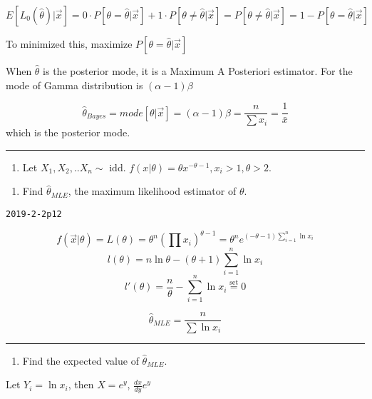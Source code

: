 \documentclass[12pt,]{article}
\providecommand{\tightlist}{%
  \setlength{\itemsep}{0pt}\setlength{\parskip}{0pt}}
\begin{document}
\[E[L_0(\hat\theta)|\vec x]=0\cdot P[\theta=\hat\theta|\vec x]+1\cdot P[\theta\neq\hat\theta|\vec x]=P[\theta\neq\hat\theta|\vec x]=1-P[\theta=\hat\theta|\vec x]\]

To minimized this, maximize \(P[\theta=\hat\theta|\vec x]\)

When \(\hat\theta\) is the posterior mode, it is a Maximum A Posteriori
estimator. For the mode of Gamma distribution is \((\alpha-1)\beta\)

\[\hat\theta_{Bayes}=mode[\theta|\vec x]=(\alpha-1)\beta=\frac{n}{\sum x_i}=\frac{1}{\bar x}\]
which is the posterior mode.

\begin{center}\rule{0.5\linewidth}{\linethickness}\end{center}

\begin{enumerate}
\def\labelenumi{\arabic{enumi}.}
\setcounter{enumi}{4}
\tightlist
\item
  \textcolor[rgb]{0.5,0.5,0.5}{Let $X_1,X_2,..X_n\sim$ idd. $f(x|\theta)=\theta x^{-\theta-1}, x_i>1, \theta>2$.}
\end{enumerate}

\begin{enumerate}
\def\labelenumi{\alph{enumi}.}
\tightlist
\item
  \textcolor[rgb]{0.5,0.5,0.5}{Find $\hat\theta_{MLE}$, the maximum likelihood estimator of $\theta$.}
\end{enumerate}

\texttt{2019-2-2p12}

\[f(\vec x|\theta)=L(\theta)=\theta^n(\prod x_i)^{\theta-1}=\theta^n e^{(-\theta-1)\sum^n_{i=1} \ln x_i}\]
\[l(\theta)=n\ln\theta-(\theta+1)\sum^n_{i=1} \ln x_i\]
\[l'(\theta)=\frac{n}\theta-\sum^n_{i=1} \ln x_i\overset{\text{set}}{=}0\]

\[\hat\theta_{MLE}=\frac{n}{\sum\ln x_i}\]

\begin{center}\rule{0.5\linewidth}{\linethickness}\end{center}

\begin{enumerate}
\def\labelenumi{\alph{enumi}.}
\setcounter{enumi}{1}
\tightlist
\item
  \textcolor[rgb]{0.5,0.5,0.5}{Find the expected value of $\hat\theta_{MLE}$.}
\end{enumerate}

Let \(Y_i=\ln x_i\), then \(X=e^y\), \(\frac{dx}{dy}e^y\)
\end{document}
